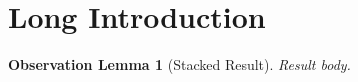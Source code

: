 \section[Short Intro]{Long Introduction}\label{sec:intro}
\newtheorem{oblemma}{Observation Lemma}[section]
\begin{oblemma}[Stacked Result]\label{obs:main}
Result body.
\end{oblemma}
